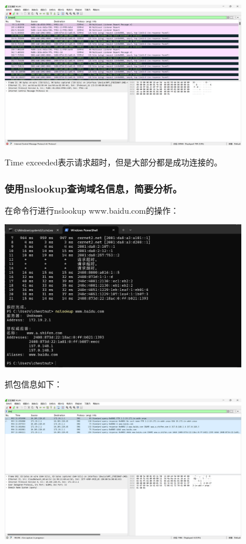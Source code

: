 \documentclass{article}
\begin{document}
\vspace{10pt}
\centerline{\includegraphics[width=0.8\textwidth]{1_1_images/19.png}}
\vspace{10pt}

Time exceeded表示请求超时，但是大部分都是成功连接的。
\subsubsection{使用nslookup查询域名信息，简要分析。}
在命令行进行nslookup www.baidu.com的操作：

\vspace{10pt}
\centerline{\includegraphics[width=0.8\textwidth]{1_1_images/20.png}}
\vspace{10pt}
抓包信息如下：

\vspace{10pt}
\centerline{\includegraphics[width=0.8\textwidth]{1_1_images/21.png}}
\vspace{10pt}
\end{document}
